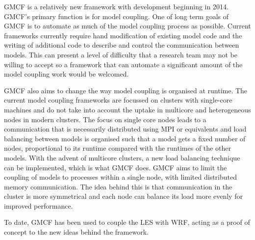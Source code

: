 GMCF is a relatively new framework with development beginning in 2014. GMCF's
primary function is for model coupling. One of long term goals of GMCF is to
automate as much of the model coupling process as possible. Current frameworks
currently require hand modification of existing model code and the writing of
additional code to describe and control the communication between models. This
can present a level of difficulty that a research team may not be willing to
accept so a framework that can automate a significant amount of the model
coupling work would be welcomed.

GMCF also aims to change the way model coupling is organised at runtime. The
current model coupling frameworks are focussed on clusters with single-core
machines and do not take into account the uptake in multicore and heterogeneous
nodes in modern clusters. The focus on single core nodes leads to a
communication that is necessarily distributed using MPI or equivalents and load
balancing between models is organised such that a model gets a fixed number of
nodes, proportional to its runtime compared with the runtimes of the other
models. With the advent of multicore clusters, a new load balancing technique
can be implemented, which is what GMCF does. GMCF aims to limit the coupling of
models to processes within a single node, with limited distributed memory
communication. The idea behind this is that communication in the cluster is more
symmetrical and each node can balance its load more evenly for improved
performance.

To date, GMCF has been used to couple the LES with WRF, acting as a proof of
concept to the new ideas behind the framework.
